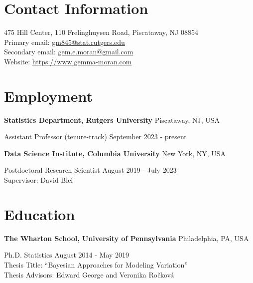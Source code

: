 \documentclass[margin,line]{res}
\newenvironment{list1}{
  \begin{list}{\ding{113}}{%
      \setlength{\itemsep}{8pt}
      \setlength{\parsep}{2pt} \setlength{\parskip}{2pt}
      \setlength{\topsep}{2pt} \setlength{\partopsep}{2pt} 
      \setlength{\leftmargin}{0.17in}}}{\end{list}}
\begin{document}
\thispagestyle{first}


\begin{resume}



\section{\sc Contact Information}
475 Hill Center, 110 Frelinghuysen Road, Piscataway, NJ 08854\\
Primary email: \href{mailto:gm845@stat.rutgers.edu}{gm845@stat.rutgers.edu} \\
Secondary email: \href{mailto:gem.e.moran@gmail.com}{gem.e.moran@gmail.com} \\
Website: \url{https://www.gemma-moran.com} \\


\section{\sc Employment}

{\bf Statistics Department, Rutgers University} \hfill Piscataway, NJ, USA\\
\vspace*{-.1in}
\begin{list1}
\item[] {Assistant Professor (tenure-track)} \hfill September 2023 - present \\
\end{list1}


{\bf Data Science Institute, Columbia University} \hfill New York, NY, USA\\
\vspace*{-.1in}
\begin{list1}
\item[] { Postdoctoral Research Scientist} \hfill August 2019 - July 2023\\
Supervisor: David Blei
\end{list1}

\section{\sc Education}


{\bf The Wharton School, University of Pennsylvania} \hfill Philadelphia, PA, USA\\
\vspace*{-.1in}
\begin{list1}
\item[] Ph.D. Statistics \hfill August 2014 - May 2019\\
Thesis Title: ``Bayesian Approaches for Modeling Variation''\\
Thesis Advisors: Edward George and Veronika Ro\v{c}kov\'{a}
\end{list1}


\end{resume}
\end{document}
